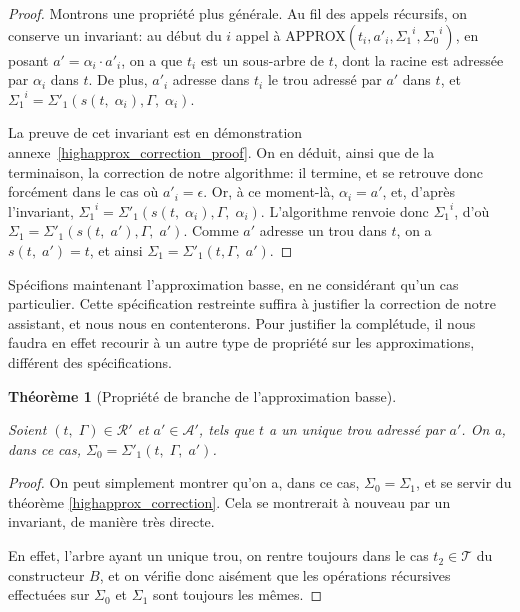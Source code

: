 \documentclass[11pt,a4paper]{article}
\theoremstyle{plain}
\newtheorem{theorem}{Théorème}
\theoremstyle{definition}
\theoremstyle{remark}
\newcommand*{\sequent}{\Gamma}
\newcommand*{\treeaddresses}{\ensuremath{\mathcal{A'}}}
\newcommand*{\trees}{\ensuremath{\mathcal{T}}}
\newcommand*{\representationspartial}{\ensuremath{\mathcal{R'}}}
\newcommand*{\lowapprox}{\ensuremath{\Sigma_0}}
\newcommand*{\highapprox}{\ensuremath{\Sigma_1}}
\newcommand*{\highapproxspec}{\ensuremath{\Sigma'_1}}
\newcommand*{\treesimplify}{\ensuremath{s}}
\begin{document}
\begin{proof}
    Montrons une propriété plus générale. Au fil des appels récursifs, on conserve un invariant: au début du $i$\ieme{} appel à APPROX$(t_i, a'_i, {\highapprox}^i, {\lowapprox}^i)$, en posant $a' = {\alpha}_i \cdot a'_i$, on a que $t_i$ est un sous-arbre de $t$, dont la racine est adressée par ${\alpha}_i$ dans $t$. De plus, $a'_i$ adresse dans $t_i$ le trou adressé par $a'$ dans $t$, et ${\highapprox}^i = \highapproxspec \left( \treesimplify( t, \; {\alpha}_i ), \sequent, \; {\alpha}_i \right)$.

    La preuve de cet invariant est en démonstration annexe~\ref{highapprox_correction_proof}. On en déduit, ainsi que de la terminaison, la correction de notre algorithme: il termine, et se retrouve donc forcément dans le cas où $a'_i = \epsilon$. Or, à ce moment-là, $\alpha_i = a'$, et, d'après l'invariant, ${\highapprox}^i = \highapproxspec \left( \treesimplify( t, \; {\alpha}_i ), \sequent, \; {\alpha}_i \right)$. L'algorithme renvoie donc ${\highapprox}^i$, d'où $\highapprox = \highapproxspec \left( \treesimplify( t, \; a' ), \sequent, \; a' \right)$. Comme $a'$ adresse un trou dans $t$, on a $\treesimplify( t, \; a' ) = t$, et ainsi $\highapprox = \highapproxspec \left( t, \sequent, \; a' \right)$.
\end{proof}

Spécifions maintenant l'approximation basse, en ne considérant qu'un cas particulier. Cette spécification restreinte suffira à justifier la correction de notre assistant, et nous nous en contenterons. Pour justifier la complétude, il nous faudra en effet recourir à un autre type de propriété sur les approximations, différent des spécifications.
    
\begin{theorem}[Propriété de branche de l'approximation basse]
    \label{lowapprox_correction}
    
    Soient $(t, \; \sequent) \in \representationspartial$ et $a' \in \treeaddresses$, tels que $t$ a un unique trou adressé par $a'$.
    On a, dans ce cas, $\lowapprox = \highapproxspec \left( t, \; \sequent, \; a' \right)$. 
\end{theorem}

\begin{proof}
    On peut simplement montrer qu'on a, dans ce cas, $\lowapprox=\highapprox$, et se servir du théorème \ref{highapprox_correction}. Cela se montrerait à nouveau par un invariant, de manière très directe. 
    
    En effet, l'arbre ayant un unique trou, on rentre toujours dans le cas $t_2 \in \trees$ du constructeur $B$, et on vérifie donc aisément que les opérations récursives effectuées sur $\lowapprox$ et $\highapprox$ sont toujours les mêmes.
\end{proof}
\end{document}
